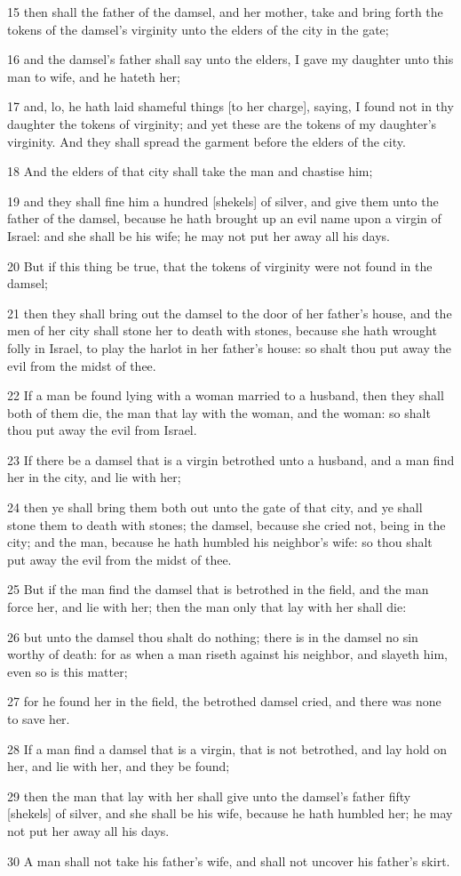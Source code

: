 \par 15 then shall the father of the damsel, and her mother, take and bring forth the tokens of the damsel's virginity unto the elders of the city in the gate;
\par 16 and the damsel's father shall say unto the elders, I gave my daughter unto this man to wife, and he hateth her;
\par 17 and, lo, he hath laid shameful things [to her charge], saying, I found not in thy daughter the tokens of virginity; and yet these are the tokens of my daughter's virginity. And they shall spread the garment before the elders of the city.
\par 18 And the elders of that city shall take the man and chastise him;
\par 19 and they shall fine him a hundred [shekels] of silver, and give them unto the father of the damsel, because he hath brought up an evil name upon a virgin of Israel: and she shall be his wife; he may not put her away all his days.
\par 20 But if this thing be true, that the tokens of virginity were not found in the damsel;
\par 21 then they shall bring out the damsel to the door of her father's house, and the men of her city shall stone her to death with stones, because she hath wrought folly in Israel, to play the harlot in her father's house: so shalt thou put away the evil from the midst of thee.
\par 22 If a man be found lying with a woman married to a husband, then they shall both of them die, the man that lay with the woman, and the woman: so shalt thou put away the evil from Israel.
\par 23 If there be a damsel that is a virgin betrothed unto a husband, and a man find her in the city, and lie with her;
\par 24 then ye shall bring them both out unto the gate of that city, and ye shall stone them to death with stones; the damsel, because she cried not, being in the city; and the man, because he hath humbled his neighbor's wife: so thou shalt put away the evil from the midst of thee.
\par 25 But if the man find the damsel that is betrothed in the field, and the man force her, and lie with her; then the man only that lay with her shall die:
\par 26 but unto the damsel thou shalt do nothing; there is in the damsel no sin worthy of death: for as when a man riseth against his neighbor, and slayeth him, even so is this matter;
\par 27 for he found her in the field, the betrothed damsel cried, and there was none to save her.
\par 28 If a man find a damsel that is a virgin, that is not betrothed, and lay hold on her, and lie with her, and they be found;
\par 29 then the man that lay with her shall give unto the damsel's father fifty [shekels] of silver, and she shall be his wife, because he hath humbled her; he may not put her away all his days.
\par 30 A man shall not take his father's wife, and shall not uncover his father's skirt.

